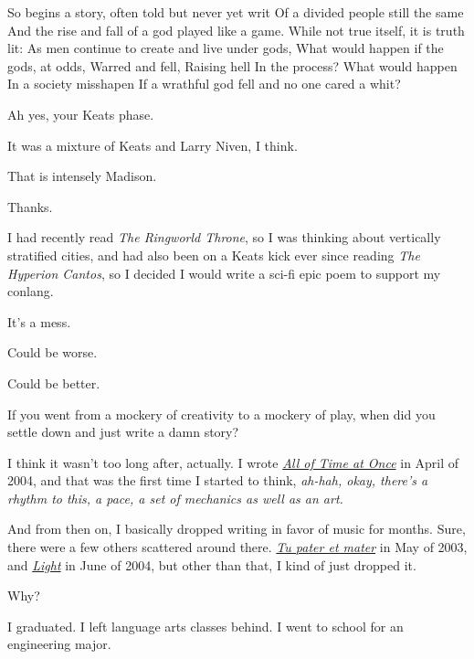 So begins a story, often told but never yet writ Of a divided people still the same And the rise and fall of a god played like a game. While not true itself, it is truth lit: As men continue to create and live under gods, What would happen if the gods, at odds, Warred and fell, Raising hell In the process? What would happen In a society misshapen If a wrathful god fell and no one cared a whit?

\begin{ally}
Ah yes, your Keats phase.
\end{ally}
It was a mixture of Keats and Larry Niven, I think.

\begin{ally}
That is intensely Madison.
\end{ally}
Thanks.

I had recently read \emph{The Ringworld Throne}, so I was thinking about vertically stratified cities, and had also been on a Keats kick ever since reading \emph{The Hyperion Cantos}, so I decided I would write a sci-fi epic poem to support my conlang.

It's a mess.

\begin{ally}
Could be worse.
\end{ally}
Could be better.
\newpage

\begin{ally}
If you went from a mockery of creativity to a mockery of play, when did you settle down and just write a damn story?
\end{ally}
I think it wasn't too long after, actually. I wrote \href{https://writing.drab-makyo.com/fiction/all-of-time-at-once/}{\emph{All of Time at Once}} in April of 2004, and that was the first time I started to think, \emph{ah-hah, okay, there's a rhythm to this, a pace, a set of mechanics as well as an art.}

And from then on, I basically dropped writing in favor of music for months. Sure, there were a few others scattered around there. \href{https://writing.drab-makyo.com/fiction/tu-pater-et-mater/}{\emph{Tu pater et mater}} in May of 2003, and \href{https://writing.drab-makyo.com/fiction/light/}{\emph{Light}} in June of 2004, but other than that, I kind of just dropped it.

\begin{ally}
Why?
\end{ally}
I graduated. I left language arts classes behind. I went to school for an engineering major.


